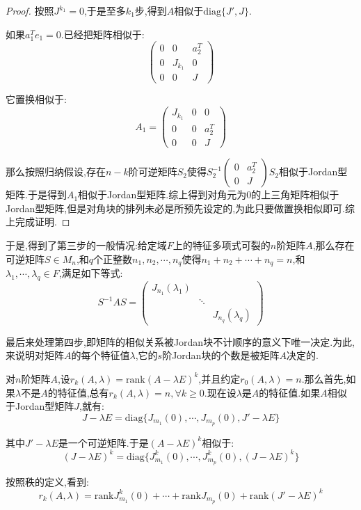 \begin{proof}
	按照$J^{k_1}=0$,于是至多$k_1$步,得到$A$相似于$\mathrm{diag}\{J',J\}$.
	
	如果$a_1^Te_1=0$.已经把矩阵相似于:
	$$\left(\begin{array}{ccc}
	0&0&a_2^T\\
	0&J_{k_1}&0\\
	0&0&J
	\end{array}\right)$$
	
	它置换相似于:
	$$A_1=\left(\begin{array}{ccc}
	J_{k_1}&0&0\\
	0&0&a_2^T\\
	0&0&J
	\end{array}\right)$$
	
	那么按照归纳假设,存在$n-k$阶可逆矩阵$S_2$使得$S_2^{-1}\left(\begin{array}{cc}
	0&a_2^T\\
	0&J
	\end{array}\right)S_2$相似于Jordan型矩阵.于是得到$A_1$相似于Jordan型矩阵.综上得到对角元为0的上三角矩阵相似于Jordan型矩阵,但是对角块的排列未必是所预先设定的,为此只要做置换相似即可.综上完成证明.
	
\end{proof}

于是,得到了第三步的一般情况:给定域$F$上的特征多项式可裂的$n$阶矩阵$A$,那么存在可逆矩阵$S\in M_n$,和$q$个正整数$n_1,n_2,\cdots,n_q$使得$n_1+n_2+\cdots+n_q=n$,和$\lambda_1,\cdots,\lambda_q\in F$,满足如下等式:
$$S^{-1}AS=\left(\begin{array}{ccc}
J_{n_1}(\lambda_1)&&\\
&\ddots&\\
&&J_{n_q}(\lambda_q)\end{array}\right)$$

最后来处理第四步,即矩阵的相似关系被Jordan块不计顺序的意义下唯一决定.为此,来说明对矩阵$A$的每个特征值$\lambda$,它的$s$阶Jordan块的个数是被矩阵$A$决定的.

对$n$阶矩阵$A$,设$r_k(A,\lambda)=\mathrm{rank}(A-\lambda E)^k$,并且约定$r_0(A,\lambda)=n$.那么首先,如果$\lambda$不是$A$的特征值,总有$r_k(A,\lambda)=n,\forall k\ge0$.现在设$\lambda$是$A$的特征值.如果$A$相似于Jordan型矩阵$J$,就有:
$$J-\lambda E=\mathrm{diag}\{J_{m_1}(0),\cdots,J_{m_p}(0), J'-\lambda E\}$$

其中$J'-\lambda E$是一个可逆矩阵.于是$(A-\lambda E)^k$相似于:
$$(J-\lambda E)^k=\mathrm{diag}\{J_{m_1}^k(0),\cdots,J_{m_p}^k(0),(J-\lambda E)^k\}$$

按照秩的定义,看到:
$$r_k(A,\lambda)=\mathrm{rank}J_{m_1}^k(0)+\cdots+\mathrm{rank}J_{m_p}(0)+\mathrm{rank}(J'-\lambda E)^k$$

